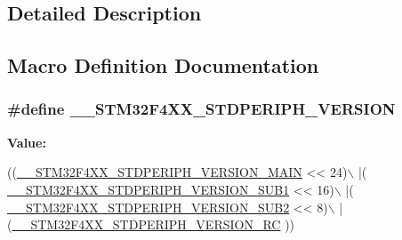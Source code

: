 \subsection{Detailed Description}


\subsection{Macro Definition Documentation}
\hypertarget{group___library__configuration__section_ga2e0157b17c803dbc58b024ec8b2942e1}{
\subsubsection[{\-\_\-\-\_\-\-S\-T\-M32\-F4\-X\-X\-\_\-\-S\-T\-D\-P\-E\-R\-I\-P\-H\-\_\-\-V\-E\-R\-S\-I\-O\-N}]{\setlength{\rightskip}{0pt plus 5cm}\#define \-\_\-\-\_\-\-S\-T\-M32\-F4\-X\-X\-\_\-\-S\-T\-D\-P\-E\-R\-I\-P\-H\-\_\-\-V\-E\-R\-S\-I\-O\-N}}\label{group___library__configuration__section_ga2e0157b17c803dbc58b024ec8b2942e1}
{\bfseries Value\-:}
\begin{DoxyCode}
((\hyperlink{group___library__configuration__section_gab16ffe03509714c63d5e530131c494f4}{\_\_STM32F4XX\_STDPERIPH\_VERSION\_MAIN} << 24)\(\backslash\)
                                             |(
      \hyperlink{group___library__configuration__section_gadce716e810a51b042298fb21b63e5366}{\_\_STM32F4XX\_STDPERIPH\_VERSION\_SUB1} << 16)\(\backslash\)
                                             |(
      \hyperlink{group___library__configuration__section_ga4b16607e43a35289dc5ebb608b1261d4}{\_\_STM32F4XX\_STDPERIPH\_VERSION\_SUB2} << 8)\(\backslash\)
                                             |(\hyperlink{group___library__configuration__section_gad5bec5e54ac96b9238a6363f2088f85c}{\_\_STM32F4XX\_STDPERIPH\_VERSION\_RC}
      ))
\end{DoxyCode}
